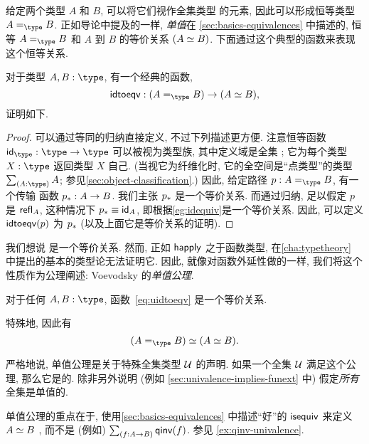 %
%
给定两个类型 $A$ 和 $B$, 可以将它们视作全集类型 \type 的元素, 因此可以形成恒等类型 $\id[\type]AB$.
正如导论中提及的一样, \emph{单值}在 \cref{sec:basics-equivalences} 中描述的, 恒等 $\id[\type]AB$ 和 $A$ 到 $B$ 的等价关系 $(\eqv AB)$.
下面通过这个典型的函数来表现这个恒等关系.

\begin{lem}
    \label{thm:idtoeqv}
    对于类型 $A,B:\type$, 有一个经典的函数,
    \begin{equation}
        \label{eq:uidtoeqv}
        \idtoeqv : (\id[\type]AB) \to (\eqv A B),
    \end{equation}
    证明如下.
\end{lem}
\begin{proof}
    可以通过等同的归纳直接定义, 不过下列描述更方便.
    注意恒等函数 $\idfunc[\type]:\type\to\type$ 可以被视为类型族, 其中定义域是全集 \type;
    它为每个类型 $X:\type$ 返回类型 $X$ 自己.
    (当视它为纤维化时, 它的全空间是``点类型''的类型 $\sm{A:\type}A$; 参见\cref{sec:object-classification}.)
    因此, 给定路径 $p:A =_\type B$, 有一个传输 函数 $\transf{p}:A \to B$.
    我们主张 $\transf{p}$ 是一个等价关系.
    而通过归纳, 足以假定 $p$ 是 $\refl A$, 这种情况下 $\transf{p} \jdeq \idfunc[A]$, 即根据\cref{eg:idequiv}是一个等价关系.
    因此, 可以定义 $\idtoeqv(p)$ 为 $\transf{p}$ (以及上面它是等价关系的证明).
\end{proof}

我们想说 \idtoeqv 是一个等价关系.
然而, 正如 $\happly$ 之于函数类型, 在\cref{cha:typetheory} 中提出的基本的类型论无法证明它.
因此, 就像对函数外延性做的一样, 我们将这个性质作为公理阐述: Voevodsky 的\emph{单值公理}.

\begin{axiom}[Univalence]
    \label{axiom:univalence}
    对于任何 $A,B:\type$, 函数~\eqref{eq:uidtoeqv} 是一个等价关系.
\end{axiom}

特殊地, 因此有
\[
    \eqv{(\id[\type]{A}{B})}{(\eqv A B)}.
\]

严格地说, 单值公理是关于特殊全集类型 $\UU$ 的声明.
如果一个全集 $\UU$ 满足这个公理, 那么它是的.
%
%
除非另外说明 (例如 \cref{sec:univalence-implies-funext} 中) 假定\emph{所有}全集是单值的.

\begin{rmk}
    单值公理的重点在于, 使用\cref{sec:basics-equivalences} 中描述``好''的 $\isequiv$ 来定义 $\eqv AB$ , 而不是 (例如) $\sm{f:A\to B} \qinv(f)$.
    参见 \cref{ex:qinv-univalence}.
\end{rmk}

